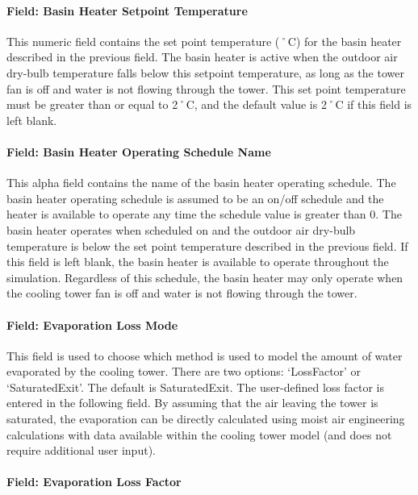 \paragraph{Field: Basin Heater Setpoint Temperature}\label{field-basin-heater-setpoint-temperature-1}

This numeric field contains the set point temperature (˚C) for the basin heater described in the previous field. The basin heater is active when the outdoor air dry-bulb temperature falls below this setpoint temperature, as long as the tower fan is off and water is not flowing through the tower. This set point temperature must be greater than or equal to 2˚C, and the default value is 2˚C if this field is left blank.

\paragraph{Field: Basin Heater Operating Schedule Name}\label{field-basin-heater-operating-schedule-name-1}

This alpha field contains the name of the basin heater operating schedule. The basin heater operating schedule is assumed to be an on/off schedule and the heater is available to operate any time the schedule value is greater than 0. The basin heater operates when scheduled on and the outdoor air dry-bulb temperature is below the set point temperature described in the previous field. If this field is left blank, the basin heater is available to operate throughout the simulation. Regardless of this schedule, the basin heater may only operate when the cooling tower fan is off and water is not flowing through the tower.

\paragraph{Field: Evaporation Loss Mode}\label{field-evaporation-loss-mode-1}

This field is used to choose which method is used to model the amount of water evaporated by the cooling tower. There are two options: `LossFactor' or `SaturatedExit'. The default is SaturatedExit. The user-defined loss factor is entered in the following field. By assuming that the air leaving the tower is saturated, the evaporation can be directly calculated using moist air engineering calculations with data available within the cooling tower model (and does not require additional user input).

\paragraph{Field: Evaporation Loss Factor}\label{field-evaporation-loss-factor-1}

